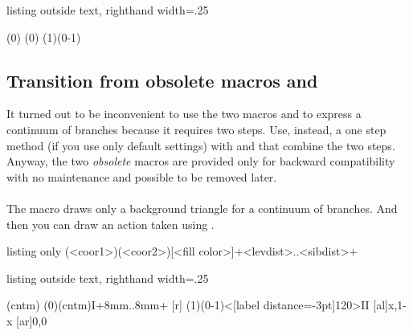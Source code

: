 \begin{tcblisting}{listing outside text, righthand width=.25\linewidth}
\begin{istgame}[scale=.7,xscale=1]
\istrootcntmA(0)  \istbA         \endist
\cntmAInfosetO[fill=blue!20](0)
\xtdistance{10mm}{20mm}
\istroot(1)(0-1)  \istb   \istb  \endist
\end{istgame}
\end{tcblisting}


\subsection{Transition from obsolete macros \protect\cmd{\istcntm} and \protect\cmd{\istcntmarc}}

It turned out to be inconvenient to use the two macros \cmd{\istcntm} and \cmd{\istcntmarc} to express a continuum of branches because it requires two steps. Use, instead, a one step method (if you use only default settings) with \cmd{\istrootcntm} and \cmd{\istrootcntmA} that combine the two steps. Anyway, the two \emph{obsolete} macros are provided only for backward compatibility with no maintenance and possible to be removed later.

\paragraph{\protect\cmd{\istcntm}}

The macro \cmd{\istcntm} draws only a background triangle for a continuum of branches.
And then you can draw an action taken using \cmd{\istroot}.

\begin{tcblisting}{listing only}
  (<coor1>)(<coor2>)[<fill color>]+<levdist>..<sibdist>+
\end{tcblisting}



\begin{tcblisting}{listing outside text, righthand width=.25\linewidth}
\begin{istgame}[scale=1.2]
\istcntm(cntm)
\istroot(0)(cntm){I}+8mm..8mm+
  [r]  \istbm  \endist
\xtdistance{10mm}{20mm}
\istroot(1)(0-1)<[label distance=-3pt]120>{II}
  [al]{x,1-x}  [ar]{0,0}  \endist
\end{istgame}
\end{tcblisting}

